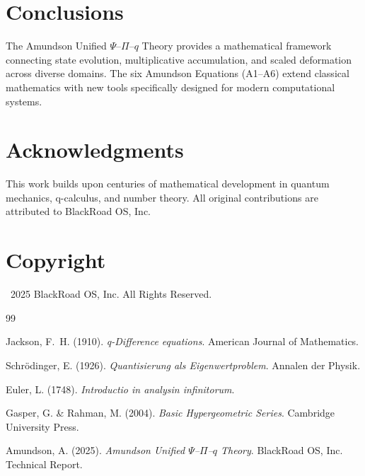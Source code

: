 \documentclass[12pt,a4paper]{article}
\begin{document}
\section{Conclusions}

The Amundson Unified $\Psi$--$\Pi$--$q$ Theory provides a mathematical framework connecting state evolution, multiplicative accumulation, and scaled deformation across diverse domains. The six Amundson Equations (A1--A6) extend classical mathematics with new tools specifically designed for modern computational systems.

\section*{Acknowledgments}

This work builds upon centuries of mathematical development in quantum mechanics, q-calculus, and number theory. All original contributions are attributed to BlackRoad OS, Inc.

\section*{Copyright}

\textcopyright\, 2025 BlackRoad OS, Inc. All Rights Reserved.

\begin{thebibliography}{99}

Jackson, F.~H. (1910).
\textit{q-Difference equations}.
American Journal of Mathematics.

Schrödinger, E. (1926).
\textit{Quantisierung als Eigenwertproblem}.
Annalen der Physik.

Euler, L. (1748).
\textit{Introductio in analysin infinitorum}.

Gasper, G. \& Rahman, M. (2004).
\textit{Basic Hypergeometric Series}.
Cambridge University Press.

Amundson, A. (2025).
\textit{Amundson Unified $\Psi$--$\Pi$--$q$ Theory}.
BlackRoad OS, Inc. Technical Report.

\end{thebibliography}
\end{document}
